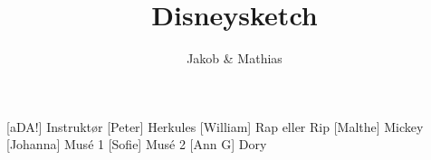\documentclass[a4paper,11pt]{article}
\title{Disneysketch}
\author{Jakob \& Mathias}
\begin{document}
\maketitle

\begin{roles}
[aDA!] Instruktør
[Peter] Herkules
[William] Rap eller Rip
[Malthe] Mickey
[Johanna] Musé 1
[Sofie] Musé 2
[Ann G] Dory
\end{roles}

\begin{props}
\end{props}

  
\end{document}
